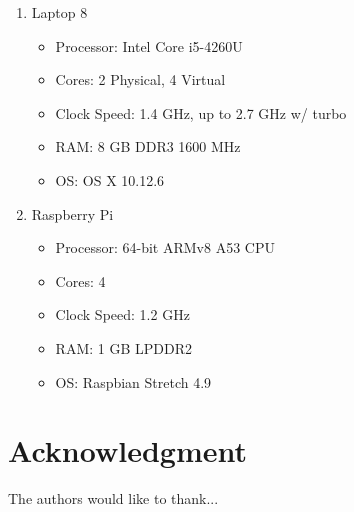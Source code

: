 \documentclass[journal]{IEEEtran}
\begin{document}
\begin{enumerate}
{	}
\item{Laptop 8
	\begin{itemize}
	\item{Processor: Intel Core i5-4260U}
	\item{Cores: 2 Physical, 4 Virtual}
	\item{Clock Speed: 1.4 GHz, up to 2.7 GHz w/ turbo}
	\item{RAM: 8 GB DDR3 1600 MHz}
	\item{OS: OS X 10.12.6}
	\end{itemize}
	}
\item{Raspberry Pi
	\begin{itemize}
	\item{Processor: 64-bit ARMv8 A53 CPU}
	\item{Cores: 4}
	\item{Clock Speed: 1.2 GHz}
	\item{RAM: 1 GB LPDDR2}
	\item{OS: Raspbian Stretch 4.9}
	\end{itemize}
	}

\end{enumerate}

\section*{Acknowledgment}


The authors would like to thank...


\ifCLASSOPTIONcaptionsoff
  \newpage
\fi


\nocite{*}


%
%
%
\end{document}
